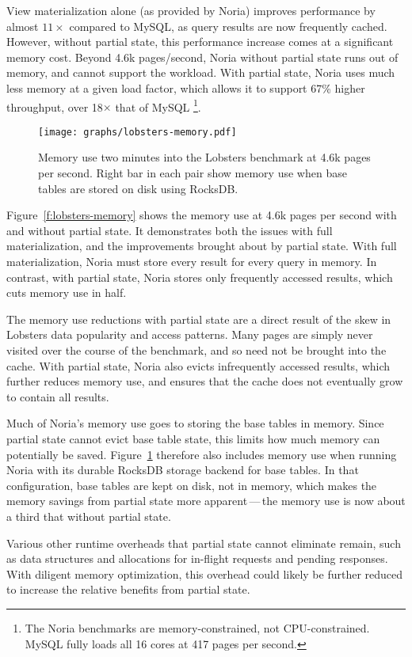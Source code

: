 View materialization alone (as provided by Noria) improves performance by almost
$11\times$ compared to MySQL, as query results are now frequently cached.
However, without partial state, this performance increase comes at a significant
memory cost. Beyond 4.6k pages/second, Noria without partial state runs out of
memory, and cannot support the workload. With partial state, Noria uses much
less memory at a given load factor, which allows it to support 67\% higher
throughput, over 18$\times$ that of MySQL%
\footnote{The Noria benchmarks are memory-constrained, not CPU-constrained.
MySQL fully loads all 16 cores at 417 pages per second.}.

\begin{figure}[h]
  \centering
  \texttt{[image: graphs/lobsters-memory.pdf]}
  \caption{Memory use two minutes into the Lobsters benchmark at 4.6k pages per
  second. Right bar in each pair show memory use when base tables are stored on
  disk using RocksDB.}
  \label{f:lobsters-memory}
\end{figure}

Figure~\vref{f:lobsters-memory} shows the memory use at 4.6k pages per second
with and without partial state. It demonstrates both the issues with full
materialization, and the improvements brought about by partial state. With full
materialization, Noria must store every result for every query in memory. In
contrast, with partial state, Noria stores only frequently accessed results,
which cuts memory use in half.

The memory use reductions with partial state are a direct result of the skew in
Lobsters data popularity and access patterns. Many pages are simply never
visited over the course of the benchmark, and so need not be brought into the
cache. With partial state, Noria also evicts infrequently accessed results,
which further reduces memory use, and ensures that the cache does not eventually
grow to contain all results.

Much of Noria's memory use goes to storing the base tables in memory. Since
partial state cannot evict base table state, this limits how much memory can
potentially be saved. Figure~\ref{f:lobsters-memory} therefore also includes
memory use when running Noria with its durable RocksDB storage backend for base
tables. In that configuration, base tables are kept on disk, not in memory,
which makes the memory savings from partial state more apparent\,---\,the memory
use is now about a third that without partial state.

Various other runtime overheads that partial state cannot eliminate remain, such
as data structures and allocations for in-flight requests and pending responses.
With diligent memory optimization, this overhead could likely be further reduced
to increase the relative benefits from partial state.

